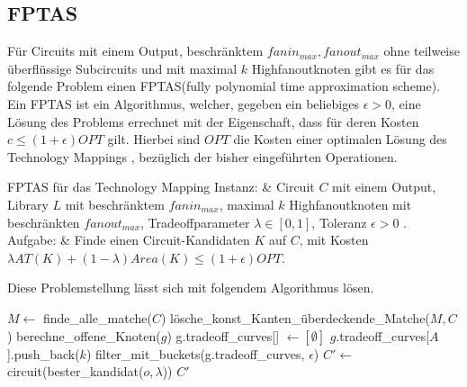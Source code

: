 \documentclass[11pt, a4paper, german]{article}
\newcommand{\TM}{Technology  Mapping }
\begin{document}
\subsection{FPTAS}
\label{subsec:fptas}
Für Circuits mit einem Output, beschränktem $fanin_{max}, fanout_{max}$ ohne teilweise überflüssige Subcircuits und mit maximal $k$ Highfanoutknoten gibt es für das folgende Problem einen FPTAS(fully polynomial time approximation scheme). Ein FPTAS ist ein Algorithmus, welcher, gegeben ein beliebiges $\epsilon > 0$, eine Lösung des Problems errechnet mit der Eigenschaft, dass für deren Kosten $c \leq (1+\epsilon)OPT$ gilt. Hierbei sind $OPT$ die Kosten einer optimalen Lösung des Technology Mappings , bezüglich der bisher eingeführten Operationen.\\
 \begin{problem}[framed]{FPTAS für das \TM}
  Instanz:  & Circuit $C$ mit einem Output, Library $L$ mit beschr\"anktem $fanin_{max}$, maximal $k$ Highfanoutknoten mit beschränkten $fanout_{max}$, Tradeoffparameter $\lambda \in [0,1]$, Toleranz $\epsilon > 0$ .\\
  Aufgabe: &  Finde einen Circuit-Kandidaten $K$ auf $C$, mit Kosten $\lambda AT(K) + (1-\lambda)Area(K) \leq (1+\epsilon)OPT$.
\end{problem}
Diese Problemstellung lässt sich mit folgendem Algorithmus lösen.\\

\LinesNumbered
\begin{algorithm}[H]
\DontPrintSemicolon
\caption{FPTAS f\"ur das TM mit Konvexkombination}

   $M \gets$ finde\_alle\_matche($C$)\;
   lösche\_konst\_Kanten\_überdeckende\_Matche($M, C$)\;
        {
			berechne\_offene\_Knoten($g$)\;	 
        }
  {
    g.tradeoff\_curves[] $\gets [\emptyset]$\;
    {
      {
        {
        	 {
			$g$.tradeoff\_curves[$A$].push\_back($k$)\;      	 
        	 }  
        }
      }
    }
    filter\_mit\_buckets(g.tradeoff\_curves, $\epsilon$)\;
  }
  $C' \gets $ circuit(bester\_kandidat($o, \lambda$))\;
  \Return $C'$\;
\end{algorithm}\ \\
\end{document}
